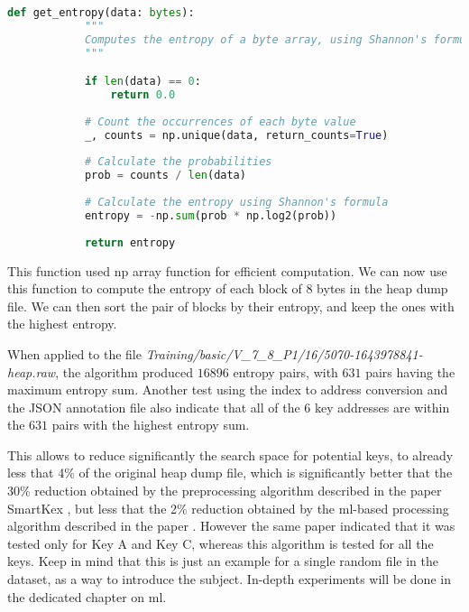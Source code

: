     \begin{minipage}{\dimexpr\linewidth-20pt}
    \begin{lstlisting}[language=python, caption={Python function to compute the Shannon entropy of a given block of 8 bytes}]
        def get_entropy(data: bytes):
            """
            Computes the entropy of a byte array, using Shannon's formula.
            """

            if len(data) == 0:
                return 0.0
            
            # Count the occurrences of each byte value
            _, counts = np.unique(data, return_counts=True)
            
            # Calculate the probabilities
            prob = counts / len(data)
            
            # Calculate the entropy using Shannon's formula
            entropy = -np.sum(prob * np.log2(prob))
            
            return entropy
    \end{lstlisting}
    \end{minipage}

    This function used np array function for efficient computation. We can now use this function to compute the entropy of each block of 8 bytes in the heap dump file. We can then sort the pair of blocks by their entropy, and keep the ones with the highest entropy.
    
    When applied to the file \textit{Training/basic/V\_7\_8\_P1/16/5070-1643978841-heap.raw}, the algorithm produced $ 16896 $ entropy pairs, with $ 631 $ pairs having the maximum entropy sum. Another test using the index to address conversion and the JSON annotation file also indicate that all of the 6 key addresses are within the $ 631 $ pairs with the highest entropy sum.
    
    This allows to reduce significantly the search space for potential keys, to already less that 4\% of the original heap dump file, which is significantly better that the 30\% reduction obtained by the preprocessing algorithm described in the paper SmartKex \cite{SmartKex22}, but less that the 2\% reduction obtained by the \acrshort{ml}-based processing algorithm described in the paper \cite{SmartKex22}. However the same paper indicated that it was tested only for Key A and Key C, whereas this algorithm is tested for all the keys. Keep in mind that this is just an example for a single random file in the dataset, as a way to introduce the subject. In-depth experiments will be done in the dedicated chapter on \acrlong{ml}.

